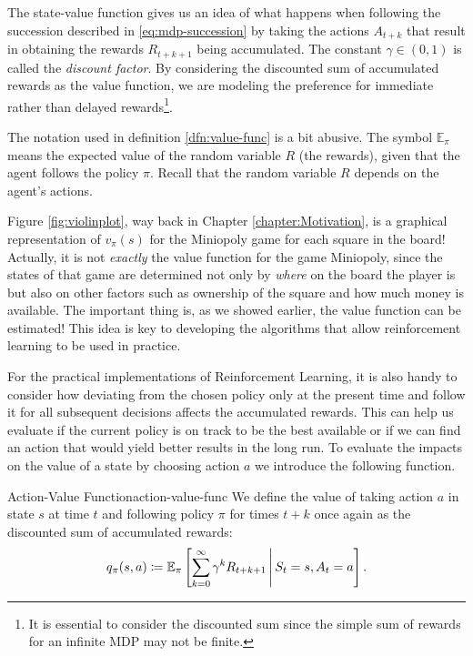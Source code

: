 The state-value function gives us an idea of what happens when following the
succession described in \eqref{eq:mdp-succession} by taking the actions
$A_{t+k}$ that result in obtaining the rewards $R_{t+k+1}$ being accumulated.
The constant $\gamma \in (0, 1)$ is called the \textit{discount factor}. By
considering the discounted sum of accumulated rewards as the value function, we
are modeling the preference for immediate rather than delayed
rewards\footnote{It is essential to consider the discounted sum since the simple
sum of rewards for an infinite MDP may not be finite.}. 

The notation used in definition \ref{dfn:value-func} is a bit abusive. The
symbol $\mathbb{E}_{\pi}$ means the expected value of the random variable $R$
(the rewards), given that the agent follows the policy $\pi$. Recall that the
random variable $R$ depends on the agent's actions.

Figure \ref{fig:violinplot}, way back in Chapter \ref{chapter:Motivation}, is
a graphical representation of $v_\pi (s)$ for the Miniopoly game for each square
in the board! Actually, it is not \textit{exactly} the value function for the
game Miniopoly, since the states of that game are determined not only by
\textit{where} on the board the player is but also on other factors such as
ownership of the square and how much money is available. The important thing is,
as we showed earlier, the value function can be estimated! This idea is key to
developing the algorithms that allow reinforcement learning to be used in
practice.

For the practical implementations of Reinforcement Learning, it is also handy to
consider how deviating from the chosen policy only at the present time and
follow it for all subsequent decisions affects the accumulated rewards. This can
help us evaluate if the current policy is on track to be the best available or
if we can find an action that would yield better results in the long run. To
evaluate the impacts on the value of a state by choosing action $a$ we introduce
the following function. 

\begin{dfn}{Action-Value Function}{action-value-func}
	We define the value of taking action $a$ in state $s$ at time $t$ and
	following policy $\pi$ for times $t+k$ once again as the discounted sum of
	accumulated rewards:
	\[
		q_\pi (s, a) \coloneqq \mathbb{E}_{\pi} \left[ \sum_{k=0}^{\infty} \gamma^{k} R_{t+k+1} \,\middle\vert\, S_t = s, A_t = a \right].
	\]
\end{dfn}

